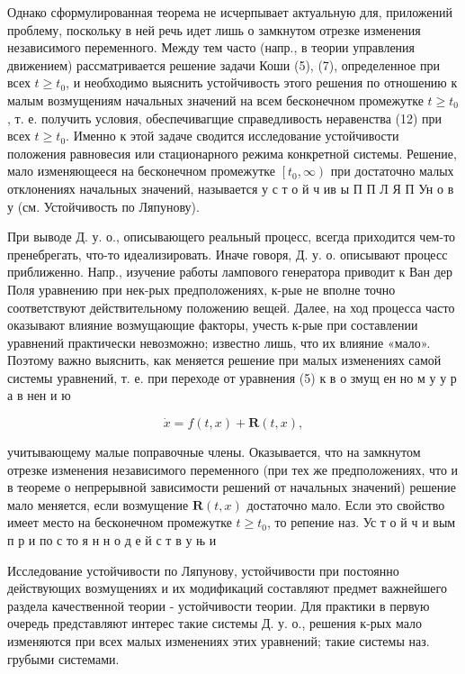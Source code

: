 \documentclass[10pt]{article}
\begin{document}
Однако сформулированная теорема не исчерпывает актуальную для, приложений проблему, поскольку в ней речь идет лишь о замкнутом отрезке изменения независимого переменного. Между тем часто (напр., в теории управления движением) рассматривается решение задачи Коши (5), (7), определенное при всех $t \geqslant t_{0}$, и необходимо выяснить устойчивость этого решения по отношению к малым возмущениям начальных значений на всем бесконечном промежутке $t \geqslant t_{0}$, т. е. получить условия, обеспечивагщие справедливость неравенства (12) при всех $t \geqslant t_{0}$. Именно к этой задаче сводится исследование устойчивости положения равновесия или стационарного режима конкретной системы. Решение, мало изменяющееся на бесконечном промежутке $\left[t_{0}, \infty\right)$ при достаточно малых отклонениях начальных значений, называется у с т о й ч ив ы П П Л Я П Ун о в у (см. Устойчивость по Ляпунову).



При выводе Д. у. о., описывающего реальный процесс, всегда приходится чем-то пренебрегать, что-то идеализировать. Иначе говоря, Д. у. о. описывают процесс приближенно. Напр., изучение работы лампового генератора приводит к Ван дер Поля уравнению при нек-рых предположениях, к-рые не вполне точно соответствуют действительному положению вещей. Далее, на ход процесса часто оказывают влияние возмущающие факторы, учесть к-рые при составлении уравнений практически невозможно; известно лишь, что их влияние «мало». Поэтому важно выяснить, как меняется решение при малых изменениях самой системы уравнений, т. е. при переходе от уравнения (5) к в о змущ ен но м у у р а в нен и ю



\[

\dot{x}=f(t, x)+\boldsymbol{R}(t, x),

\]



учитывающему малые поправочные члены. Оказывается, что на замкнутом отрезке изменения независимого переменного (при тех же предположениях, что и в теореме о непрерывной зависимости решений от начальных значений) решение мало меняется, если возмущение $\boldsymbol{R}(t, x)$ достаточно мало. Если это свойство имеет место на бесконечном промежутке $t \geqslant t_{0}$, то репение наз. Ус т о й ч и вым п р и по с то я н н о д е й с т в у њ и



Исследование устойчивости по Ляпунову, устойчивости при постоянно действующих возмущениях и их модификаций составляют предмет важнейшего раздела качественной теории - устойчивости теории. Для практики в первую очередь представляют интерес такие системы Д. у. о., решения к-рых мало изменяются при всех малых изменениях этих уравнений; такие системы наз. грубыми системами.
\end{document}
